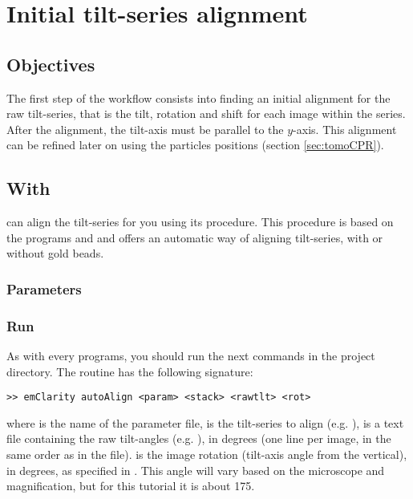 
\section{Initial tilt-series alignment} \label{sec:tilt_series_alignment}

\subsection{Objectives}

The first step of the workflow consists into finding an initial alignment for the raw tilt-series, that is the tilt, rotation and shift for each image within the series. After the alignment, the tilt-axis must be parallel to the $y$-axis. This alignment can be refined later on using the particles positions (section \ref{sec:tomoCPR}).


\subsection{With {\emClarity}} \label{sec:tilt_series_alignment:emClarity}

{\emClarity} can align the tilt-series for you using its  procedure. This procedure is based on the {\IMOD} programs {\tilt} and {\tiltalign} and offers an automatic way of aligning tilt-series, with or without gold beads.


\subsubsection{Parameters}




\subsubsection{Run}

As with every {\emClarity} programs, you should run the next commands in the project directory. The  routine has the following signature:
\begin{lstlisting}
>> emClarity autoAlign <param> <stack> <rawtlt> <rot>
\end{lstlisting}
where  is the name of the parameter file,  is the tilt-series to align (e.g. ),  is a text file containing the raw tilt-angles (e.g. ), in degrees (one line per image, in the same order as in the  file).  is the image rotation (tilt-axis angle from the vertical), in degrees, as specified in {\ETomo}. This angle will vary based on the microscope and magnification, but for this tutorial it is about 175\textdegree.

